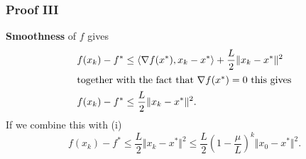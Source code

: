 \documentclass{beamer}
\begin{document}
\begin{frame}
  \frametitle{Proof III}
  \textbf{Smoothness} of $f$ gives
  \begin{align}
    f(x_k) - f^* &\le \langle \nabla f(x^*), x_k-x^* \rangle + \frac{L}{2} \Vert x_k-x^* \Vert^2\\
    \intertext{together with the fact that $\nabla f(x^*)=0$ this gives}
    f(x_k) - f^* &\le \frac{L}{2} \Vert x_k-x^* \Vert^2.
  \end{align}
  If we combine this with (i)
  \begin{equation}
     f(x_k) - f^* \le \frac{L}{2} \Vert x_k-x^* \Vert^2 \le \frac{L}{2} {\left(1-\frac{\mu}{L}\right)}^k\Vert x_0-x^* \Vert^2.
  \end{equation}
\end{frame}
\end{document}
